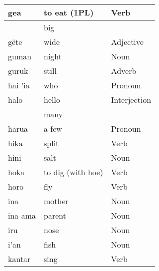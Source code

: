 \documentclass{article}
\begin{document}
\begin{longtable}{|l|l|l|}
gea                     & to eat (1PL)        & {\color[HTML]{009901} Verb}                        \\ \hline
                        & big                 & {\color[HTML]{009901} }                            \\ \cline{2-2}
\multirow{-2}{*}{gëte}  & wide                & \multirow{-2}{*}{{\color[HTML]{009901} Adjective}} \\ \hline
guman                   & night               & {\color[HTML]{009901} Noun}                        \\ \hline
guruk                   & still               & {\color[HTML]{009901} Adverb}                      \\ \hline
hai 'ia                 & who                 & {\color[HTML]{009901} Pronoun}                     \\ \hline
halo                    & hello               & {\color[HTML]{009901} Interjection}                \\ \hline
                        & many                & {\color[HTML]{009901} }                            \\ \cline{2-2}
\multirow{-2}{*}{harua} & a few               & \multirow{-2}{*}{{\color[HTML]{009901} Pronoun}}   \\ \hline
hika                    & split               & {\color[HTML]{009901} Verb}                        \\ \hline
hini                    & salt                & {\color[HTML]{009901} Noun}                        \\ \hline
hoka                    & to dig (with hoe)   & {\color[HTML]{009901} Verb}                        \\ \hline
horo                    & fly                 & {\color[HTML]{009901} Verb}                        \\ \hline
ina                     & mother              & {\color[HTML]{009901} Noun}                        \\ \hline
ina ama                 & parent              & {\color[HTML]{009901} Noun}                        \\ \hline
iru                     & nose                & {\color[HTML]{009901} Noun}                        \\ \hline
i'an                    & fish                & {\color[HTML]{009901} Noun}                        \\ \hline
kantar                  & sing                & {\color[HTML]{009901} Verb}                        \\ \hline

\end{longtable}
\end{document}

